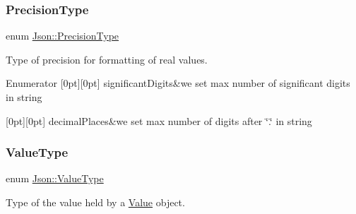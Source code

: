 \subsubsection{\texorpdfstring{Precision\+Type}{PrecisionType}}
{\footnotesize\ttfamily enum \hyperlink{namespaceJson_af6e1447a3c43e3a62e11050dd0a11ce8}{Json\+::\+Precision\+Type}}



Type of precision for formatting of real values. 

\begin{DoxyEnumFields}{Enumerator}
[0pt][0pt]{}\mbox{\label{namespaceJson_af6e1447a3c43e3a62e11050dd0a11ce8abb30ddeaa820d370a2438dda7a08996a}} 
significant\+Digits&we set max number of significant digits in string \\
\hline

[0pt][0pt]{}\mbox{\label{namespaceJson_af6e1447a3c43e3a62e11050dd0a11ce8aaee1bf0411c550a0bb2996b7b67cae87}} 
decimal\+Places&we set max number of digits after \char`\"{}.\char`\"{} in string \\
\hline

\end{DoxyEnumFields}
\mbox{\label{namespaceJson_a7d654b75c16a57007925868e38212b4e}} 
\subsubsection{\texorpdfstring{Value\+Type}{ValueType}}
{\footnotesize\ttfamily enum \hyperlink{namespaceJson_a7d654b75c16a57007925868e38212b4e}{Json\+::\+Value\+Type}}



Type of the value held by a \hyperlink{classJson_1_1Value}{Value} object. 

